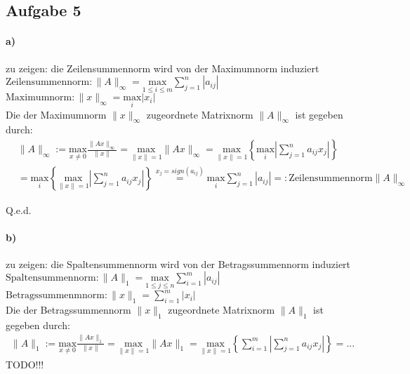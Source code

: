 \newpage
\subsection*{Aufgabe 5}
\paragraph*{a)}
zu zeigen: die Zeilensummennorm wird von der Maximumnorm induziert\\
\newline
$\mathrm{Zeilensummennorm: }\|A\|_\infty=\underset{1 \le i \le m}{\mathrm{max}} \sum_{j=1}^{n}|a_{ij}|$\\
\newline
$\mathrm{Maximumnorm: }\|x\|_\infty=\underset{i}{\mathrm{max}} |x_{i}|$\\
\newline
Die der Maximumnorm $\|x\|_\infty$ zugeordnete Matrixnorm $\|A\|_\infty$ ist gegeben durch:
\begin{align*}
&\|A\|_\infty := \underset{x\neq 0}{\mathrm{max}} \frac{\|Ax\|_\infty}{\|x\|} = 
\underset{\|x\|=1}{\mathrm{max}} \|Ax\|_\infty =
\underset{\|x\|=1}{\mathrm{max}}\left\lbrace \underset{i}{\mathrm{max}}\left|\sum_{j=1}^{n}a_{ij}x_j\right|\right\rbrace\\&=
\underset{i}{\mathrm{max}}\left\lbrace\underset{\|x\|=1}{\mathrm{max}}\left|\sum_{j=1}^{n} a_{ij}x_j\right|\right\rbrace
\overset{x_j=sign(a_{ij})}{=}\underset{i}{\mathrm{max}}\sum_{j=1}^{n}|a_{ij}|=: \mathrm{Zeilensummennorm} \|A\|_\infty
\end{align*}
\begin{flushright}Q.e.d.\end{flushright}

\paragraph*{b)}
zu zeigen: die Spaltensummennorm wird von der Betragssummennorm induziert\\
\newline
$\mathrm{Spaltensummennorm: }\|A\|_1=\underset{1 \le j \le n}{\mathrm{max}} \sum_{i=1}^{m}|a_{ij}|$\\
\newline
$\mathrm{Betragssummenmnorm: }\|x\|_1=\sum_{i=1}^{m}|x_i|$\\
\newline
Die der Betragssummennorm $\|x\|_1$ zugeordnete Matrixnorm $\|A\|_1$ ist gegeben durch:
\begin{align*}
\|A\|_1 := \underset{x\neq 0}{\mathrm{max}} \frac{\|Ax\|_1}{\|x\|} = \underset{\|x\|=1}{\mathrm{max}} \|Ax\|_1 = \underset{\|x\|=1}{\mathrm{max}}\left\lbrace\sum_{i=1}^{m}\left|\sum_{j=1}^{n}a_{ij}x_j\right|\right\rbrace = ...
\end{align*}
TODO!!!